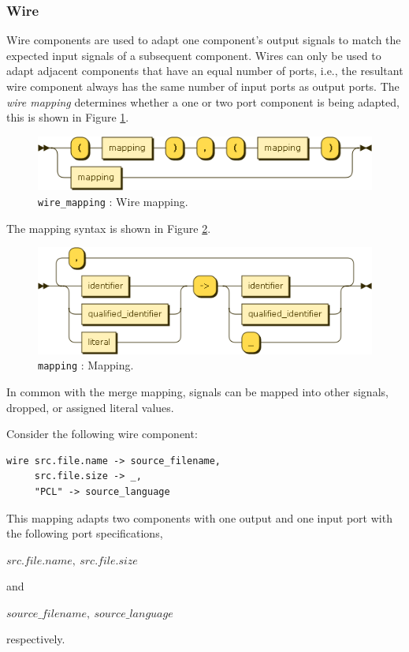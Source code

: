 \subsubsection{Wire}
Wire components are used to adapt one component's output signals to match the expected input signals of a subsequent component. Wires can only be used to adapt adjacent components that have an equal number of ports, i.e., the resultant wire component always has the same number of input ports as output ports. The \emph{wire mapping} determines whether a one or two port component is being adapted, this is shown in Figure \ref{fig:pcl-wire-mapping}.
\begin{figure}[h!]
  \centering
    \includegraphics[scale=\DiagramScale]{chapters/compiler/diagrams/wire_mapping}
  \caption{\texttt{wire\_mapping} : Wire mapping.}
  \label{fig:pcl-wire-mapping}
\end{figure}
The mapping syntax is shown in Figure \ref{fig:pcl-mapping}.
\begin{figure}[h!]
  \centering
    \includegraphics[scale=\DiagramScale]{chapters/compiler/diagrams/mapping}
  \caption{\texttt{mapping} : Mapping.}
  \label{fig:pcl-mapping}
\end{figure}
In common with the merge mapping, signals can be mapped into other signals, dropped, or assigned literal values.

Consider the following wire component:
\begin{center}
  \begin{verbatim}
wire src.file.name -> source_filename,
     src.file.size -> _,
     "PCL" -> source_language
  \end{verbatim}
\end{center}
This mapping adapts two components with one output and one input port with the following port specifications,
\begin{center}
$src.file.name,\ src.file.size$
\end{center}
and
\begin{center}
$source\_filename,\ source\_language$
\end{center}
respectively.

